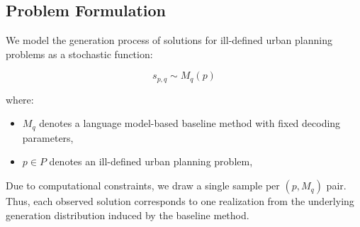 \subsection{Problem Formulation}

We model the generation process of solutions for ill-defined urban planning problems as a stochastic function:

\[
s_{p,q} \sim M_q(p)
\]

where:
\begin{itemize}
    \item $M_q$ denotes a language model-based baseline method with fixed decoding parameters,
    \item $p \in P$ denotes an ill-defined urban planning problem,
\end{itemize}

Due to computational constraints, we draw a single sample per $(p, M_q)$ pair.
Thus, each observed solution corresponds to one realization from the underlying generation distribution induced by the baseline method.